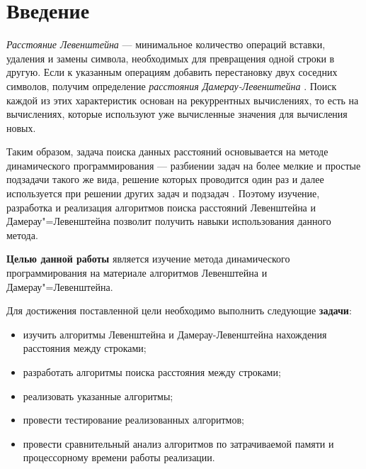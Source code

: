 \chapter*{Введение}

\textit{Расстояние Левенштейна} --- минимальное количество операций вставки,
удаления и замены символа, необходимых для превращения одной строки в другую.
Если к указанным операциям добавить перестановку двух соседних символов,
получим определение \textit{расстояния Дамерау-Левенштейна} \cite{bib01}. Поиск
каждой из этих характеристик основан на рекуррентных вычислениях, то есть на
вычислениях, которые используют уже вычисленные значения для вычисления новых.

Таким образом, задача поиска данных расстояний основывается на методе
динамического программирования --- разбиении задач на более мелкие и простые
подзадачи такого же вида, решение которых проводится один раз и далее
используется при решении других задач и подзадач \cite{bib02}. Поэтому изучение,
разработка и реализация алгоритмов поиска расстояний Левенштейна и
Дамерау"=Левенштейна позволит получить навыки использования данного метода.

\textbf{Целью данной работы} является изучение метода динамического
программирования на материале алгоритмов Левенштейна и Дамерау"=Левенштейна. 

Для достижения поставленной цели необходимо выполнить следующие
\textbf{задачи}:
\begin{itemize}[left=\parindent]
    \item изучить алгоритмы Левенштейна и Дамерау-Левенштейна нахождения
          расстояния между строками;
    \item разработать алгоритмы поиска расстояния между строками;
    \item реализовать указанные алгоритмы;
    \item провести тестирование реализованных алгоритмов;
    \item провести сравнительный анализ алгоритмов по затрачиваемой памяти и
          процессорному времени работы реализации.
\end{itemize}
